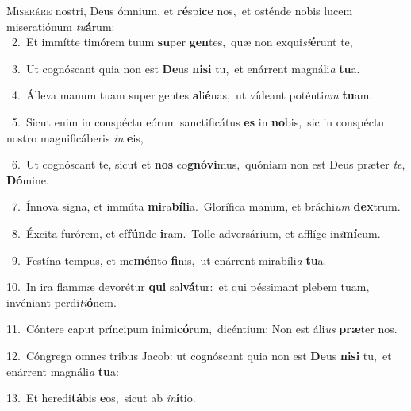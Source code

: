 \lettrine{\initial\textcolor{\initialcolor}{M}}{iserére} nostri, Deus ómnium, et \textbf{ré}\-spi\textbf{ce} nos,~\star et osténde nobis lucem miseratiónum \textit{tu}\-\textbf{á}rum:\\
{\numbfont\textcolor{\numbcolor}{~2.}}~Et immítte timórem tuum \textbf{su}\-per \textbf{gen}\-tes,~\star quæ non exqui\-\textit{si}\-\textbf{é}runt te,\par
{\numbfont\textcolor{\numbcolor}{~3.}}~Ut cognóscant quia non est \textbf{De}\-us \textbf{ni}\-\textbf{si} tu,~\star et enárrent magnáli\textit{a} \textbf{tu}\-a.\par
{\numbfont\textcolor{\numbcolor}{~4.}}~Álleva manum tuam super gentes \textbf{a}\-li\-\textbf{é}\-nas,~\star ut vídeant poténti\textit{am} \textbf{tu}\-am.\par
{\numbfont\textcolor{\numbcolor}{~5.}}~Sicut enim in conspéctu eórum sanctificátus \textbf{es} in \textbf{no}\-bis,~\star sic in conspéctu nostro magnificáberis \textit{in} \textbf{e}\-is,\par
{\numbfont\textcolor{\numbcolor}{~6.}}~Ut cognóscant te, sicut et \textbf{nos} co\-\textbf{gnó}\-\textbf{vi}mus,~\star quóniam non est Deus præter \textit{te}\-, \textbf{Dó}\-mine.\par
{\numbfont\textcolor{\numbcolor}{~7.}}~Ínnova signa, et immúta \textbf{mi}\-ra\-\textbf{bí}\-\textbf{li}a.~\star Glorífica manum, et bráchi\textit{um} \textbf{dex}\-trum.\par
{\numbfont\textcolor{\numbcolor}{~8.}}~Éxcita furórem, et ef\-\textbf{fún}\-de \textbf{i}\-ram.~\star Tolle adversárium, et afflíge in\-\textit{i}\-\textbf{mí}cum.\par
{\numbfont\textcolor{\numbcolor}{~9.}}~Festína tempus, et me\-\textbf{mén}\-to \textbf{fi}\-nis,~\star ut enárrent mirabíli\textit{a} \textbf{tu}\-a.\par
{\numbfont\textcolor{\numbcolor}{10.}}~In ira flammæ devorétur \textbf{qui} sal\-\textbf{vá}\-tur:~\star et qui péssimant plebem tuam, invéniant perdi\-\textit{ti}\-\textbf{ó}nem.\par
{\numbfont\textcolor{\numbcolor}{11.}}~Cóntere caput príncipum in\-\textbf{i}\-mi\-\textbf{có}\-rum,~\star dicéntium: Non est áli\textit{us} \textbf{præ}\-ter nos.\par
{\numbfont\textcolor{\numbcolor}{12.}}~Cóngrega omnes tribus Jacob: ut cognóscant quia non est \textbf{De}\-us \textbf{ni}\-\textbf{si} tu,~\star et enárrent magnáli\textit{a} \textbf{tu}\-a:\par
{\numbfont\textcolor{\numbcolor}{13.}}~Et heredi\-\textbf{tá}\-bis \textbf{e}\-os,~\star sicut ab \textit{in}\-\textbf{í}tio.\par
